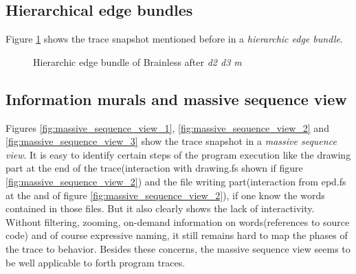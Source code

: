 \subsection*{Hierarchical edge bundles}

Figure \ref{fig:hierarchic_edge_bundle} shows the trace snapshot mentioned before in a \emph{hierarchic edge bundle}.

\begin{figure}[p]
    \centering
    
    \caption{Hierarchic edge bundle of Brainless after \emph{d2 d3 m}}
    \label{fig:hierarchic_edge_bundle}
\end{figure}


\subsection*{Information murals and massive sequence view}

Figures \ref{fig:massive_sequence_view_1}, \ref{fig:massive_sequence_view_2} and \ref{fig:massive_sequence_view_3} show the trace snapshot in a \emph{massive sequence view}. It is easy to identify certain steps of the program execution like the drawing part at the end of the trace(interaction with drawing.fs shown if figure \ref{fig:massive_sequence_view_2}) and the file writing part(interaction from epd.fs at the and of figure \ref{fig:massive_sequence_view_2}), if one know the words contained in those files. But it also clearly shows the lack of interactivity. Without filtering, zooming, on-demand information on words(references to source code) and of course expressive naming, it still remains hard to map the phases of the trace to behavior. Besides these concerns, the massive sequence view seems to be well applicable to forth program traces.

